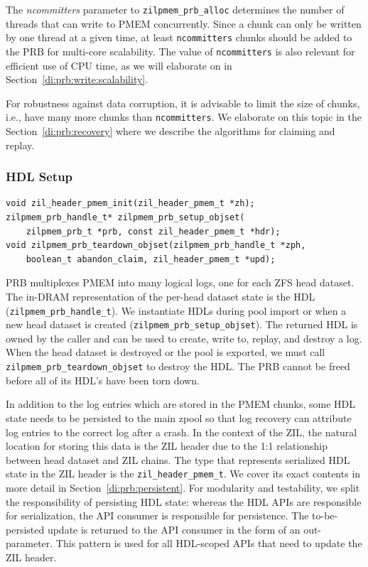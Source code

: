 \documentclass[12pt,a4paper,twoside]{book}
\begin{document}
The \textit{ncommitters} parameter to \lstinline{zilpmem_prb_alloc} determines the number of threads that can write to PMEM concurrently.
Since a chunk can only be written by one thread at a given time, at least \lstinline{ncommitters} chunks should be added to the PRB for multi-core scalability.
The value of \lstinline{ncommitters} is also relevant for efficient use of CPU time, as we will elaborate on in Section~\ref{di:prb:write:scalability}.

For robustness against data corruption, it is advisable to limit the size of chunks, i.e., have many more chunks than \lstinline{ncommitters}.
We elaborate on this topic in the Section~\ref{di:prb:recovery} where we describe the algorithms for claiming and replay.

\subsubsection{HDL Setup}\label{di:prb:api:hdl}
\begin{lstlisting}
void zil_header_pmem_init(zil_header_pmem_t *zh);
zilpmem_prb_handle_t* zilpmem_prb_setup_objset(
    zilpmem_prb_t *prb, const zil_header_pmem_t *hdr);
void zilpmem_prb_teardown_objset(zilpmem_prb_handle_t *zph,
    boolean_t abandon_claim, zil_header_pmem_t *upd);
\end{lstlisting}

PRB multiplexes PMEM into many logical logs, one for each ZFS head dataset.
The in-DRAM representation of the per-head dataset state is the HDL (\lstinline{zilpmem_prb_handle_t}).
We instantiate HDLs during pool import or when a new head dataset is created (\lstinline{zilpmem_prb_setup_objset}).
The returned HDL is owned by the caller and can be used to create, write to, replay, and destroy a log.
When the head dataset is destroyed or the pool is exported, we must call \lstinline{zilpmem_prb_teardown_objset} to destroy the HDL.
The PRB cannot be freed before all of its HDL's have been torn down.

In addition to the log entries which are stored in the PMEM chunks, some HDL state needs to be persisted to the main zpool so that log recovery can attribute log entries to the correct log after a crash.
In the context of the ZIL, the natural location for storing this data is the ZIL header due to the 1:1 relationship between head dataset and ZIL chains.
The type that represents serialized HDL state in the ZIL header is the \lstinline{zil_header_pmem_t}.
We cover its exact contents in more detail in Section~\ref{di:prb:persistent}.
For modularity and testability, we split the responsibility of persisting HDL state: whereas the HDL APIs are responsible for serialization, the API consumer is responsible for persistence.
The to-be-persisted update is returned to the API consumer in the form of an out-parameter.
This pattern is used for all HDL-scoped APIs that need to update the ZIL header.
\end{document}

